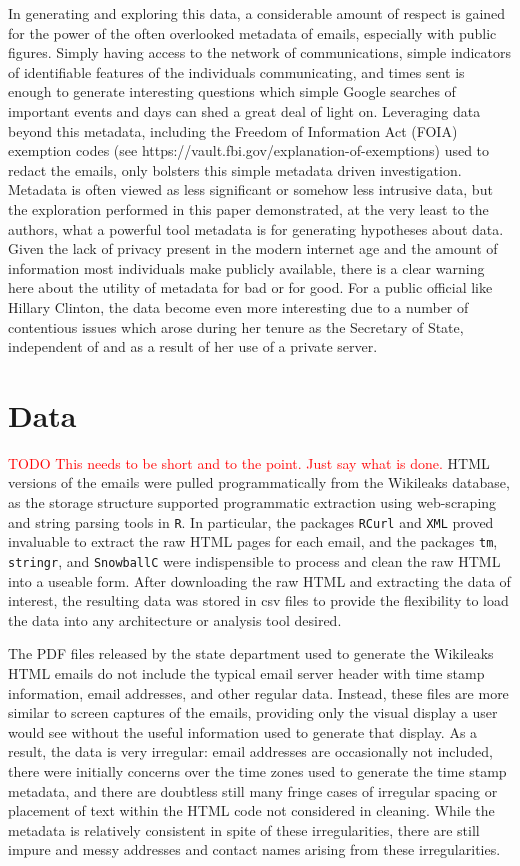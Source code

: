 \documentclass[journal]{vgtc}                %
\newcommand*{\TODO}[1]{\textcolor{red}{TODO #1}}
\begin{document}
In generating and exploring this data, a considerable amount of respect is gained for the power of the often overlooked metadata of emails, especially with public figures. Simply having access to the network of communications, simple indicators of identifiable features of the individuals communicating, and times sent is enough to generate interesting questions which simple Google searches of important events and days can shed a great deal of light on. Leveraging data beyond this metadata, including the Freedom of Information Act (FOIA) exemption codes (see https://vault.fbi.gov/explanation-of-exemptions) used to redact the emails, only bolsters this simple metadata driven investigation. Metadata is often viewed as less significant or somehow less intrusive data, but the exploration performed in this paper demonstrated, at the very least to the authors, what a powerful tool metadata is for generating hypotheses about data. Given the lack of privacy present in the modern internet age and the amount of information most individuals make publicly available, there is a clear warning here about the utility of metadata for bad or for good. For a public official like Hillary Clinton, the data become even more interesting due to a number of contentious issues which arose during her tenure as the Secretary of State, independent of and as a result of her use of a private server.

\section{Data}

\TODO{This needs to be short and to the point.  Just say what is done.}
HTML versions of the emails were pulled programmatically from the Wikileaks database, as the storage structure supported programmatic extraction using web-scraping and string parsing tools in \texttt{R}. In particular, the packages \texttt{RCurl} and \texttt{XML} proved invaluable to extract the raw HTML pages for each email, and the packages \texttt{tm}, \texttt{stringr}, and \texttt{SnowballC} were indispensible to process and clean the raw HTML into a useable form. After downloading the raw HTML and extracting the data of interest, the resulting data was stored in csv files to provide the flexibility to load the data into any architecture or analysis tool desired.

The PDF files released by the state department used to generate the Wikileaks HTML emails do not include the typical email server header with time stamp information, email addresses, and other regular data. Instead, these files are more similar to screen captures of the emails, providing only the visual display a user would see without the useful information used to generate that display. As a result, the data is very irregular: email addresses are occasionally not included, there were initially concerns over the time zones used to generate the time stamp metadata, and there are doubtless still many fringe cases of irregular spacing or placement of text within the HTML code not considered in cleaning. While the metadata is relatively consistent in spite of these irregularities, there are still impure and messy addresses and contact names arising from these irregularities.
\end{document}
